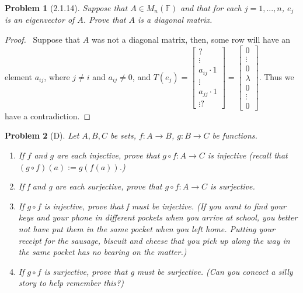 \documentclass[12pt]{article}   %
\newcommand{\F}{\mathbb{F}} %
\renewcommand{\a}{\alpha}
\newtheorem{problem}{Problem}
\begin{document}
\begin{problem}[2.1.14]
Suppose that $A \in M_n(\F)$ and that for each $j=1,...,n$, $e_j$ is an eigenvector of $A$. Prove that $A$ is a diagonal matrix.
\end{problem}
\begin{proof}\
Suppose that $A$ was not a diagonal matrix, then, some row will have an element $a_{ij}$, where $j\neq i$ and $a_{ij}\neq0$, and $T(e_{j})=\begin{bmatrix}
?\\\vdots\\a_{ij}\cdot1\\ \vdots \\ a_{jj}\cdot 1\\ \vdots ?\end{bmatrix} = \begin{bmatrix}
0 \\ \vdots \\ 0\\ \lambda \\ 0\\ \vdots \\ 0
\end{bmatrix}$. Thus we have a contradiction.
\end{proof}
\begin{problem}[D]
Let $A, B, C$ be sets, $f: A \to B$, $g: B \to C$ be functions.
\begin{enumerate}[label=\roman*.]
    \item If $f$ and $g$ are each injective, prove that $g\circ f : A \to C$ is injective (recall that $(g \circ f)(a) := g(f(a))$.)
    \item If f and g are each surjective, prove that $g \circ f : A \to C$ is surjective.
    \item If $g\circ f$ is injective, prove that f must be injective. (If you want to find your keys and your phone in different pockets when you arrive at school, you better not have put them in the same pocket when you left home. Putting your receipt for the sausage, biscuit and cheese that you pick up along the way in the same pocket has no bearing on the matter.)
    \item If $g \circ f$ is surjective, prove that g must be surjective. (Can you concoct a silly story to help remember this?)
\end{enumerate}
\end{problem}
\end{document}
